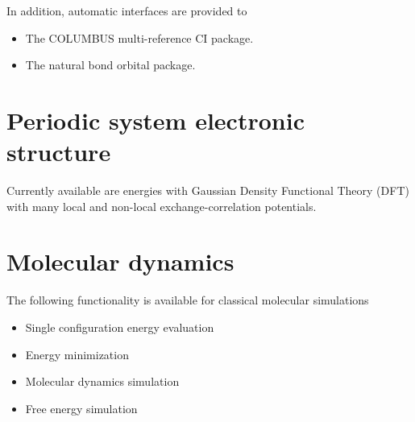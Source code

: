 In addition, automatic interfaces are provided to
\begin{itemize}
\item The COLUMBUS multi-reference CI package.
\item The natural bond orbital package.
\end{itemize}

\section{Periodic system electronic structure}

Currently available are energies with Gaussian Density Functional
Theory (DFT) with many local and non-local exchange-correlation
potentials.

\section{Molecular dynamics}

The following functionality is available for classical molecular
simulations
\begin{itemize}
\item Single configuration energy evaluation
\item Energy minimization
\item Molecular dynamics simulation
\item Free energy simulation 
\end{itemize}


